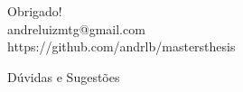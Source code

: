 \documentclass[../quali_slides.tex]{subfiles}
\begin{document}

{
	\begin{frame}[standout]
		Obrigado! \\
		andreluizmtg@gmail.com\\
		https://github.com/andrlb/mastersthesis
	\end{frame}
}


{
	\begin{frame}[standout]
		Dúvidas e Sugestões
	\end{frame}
	}
\end{document}
